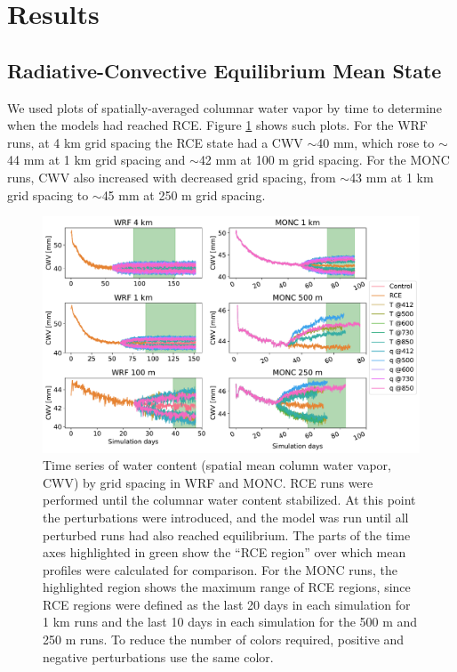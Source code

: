 \documentclass[draft]{agujournal2019}
\begin{document}
\section{Results}
\label{sec:results}

\subsection{Radiative-Convective Equilibrium Mean State}

We used plots of spatially-averaged columnar water vapor by time to determine
when the models had reached RCE. Figure \ref{fig:rce_pw} shows such plots. For
the WRF runs, at 4 km grid spacing the RCE state had a CWV $\sim$40 mm, which
rose to $\sim$44 mm at 1 km grid spacing and $\sim$42 mm at 100 m grid spacing.
For the MONC runs, CWV also increased with decreased grid spacing, from $\sim$43
mm at 1 km grid spacing to $\sim$45 mm at 250 m grid spacing.

\begin{figure}[pth]
    \noindent\includegraphics[width=\textwidth]{figures/runs_timeseries.pdf}
    \caption{Time series of water content (spatial mean column water vapor, CWV)
    by grid spacing in WRF and MONC. RCE runs were performed until the columnar
    water content stabilized. At this point the
    perturbations were introduced, and the model was run until all perturbed
    runs had also reached equilibrium. The parts of the time axes highlighted in green show
    the ``RCE region'' over which mean profiles were calculated for comparison.
    For the MONC runs, the highlighted region shows the maximum range of RCE
    regions, since RCE regions were defined as the last 20 days in each
    simulation for 1 km runs and the last 10 days in each simulation for the 500
    m and 250 m runs. To reduce the number of colors required, positive and
    negative perturbations use the same
    color.}
    \label{fig:rce_pw}
\end{figure}
\end{document}
